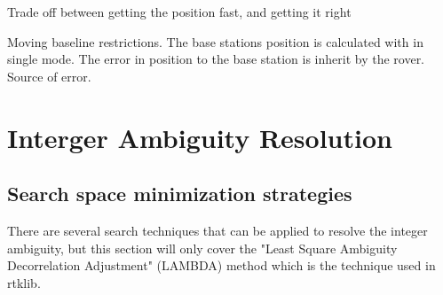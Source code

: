Trade off between getting the position fast, and getting it right 

Moving baseline restrictions. The base stations position is calculated with in single mode. The error in position to the base station is inherit by the rover. Source of error.
\section{Interger Ambiguity Resolution}

\subsection{Search space minimization strategies}
There are several search techniques that can be applied to resolve the integer ambiguity, but this section will only cover the "Least Square Ambiguity Decorrelation Adjustment" (LAMBDA) method which is the technique used in rtklib.


\cleardoublepage